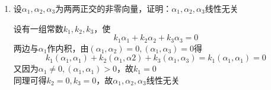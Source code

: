 \documentclass[./linear_algebra.tex]{subfiles}
\begin{document}
\begin{enumerate}
\begin{analysisbox}
        \end{analysisbox}
        \item 设$\alpha_1, \alpha_2, \alpha_3$为两两正交的非零向量，证明：$\alpha_1, \alpha_2, \alpha_3$线性无关
        \begin{analysisbox}
            设有一组常数$k_1, k_{2}, k_3$，使
            \[
                k_1\alpha_1 + k_2\alpha_2 + k_3\alpha_3 = 0
            \]
            两边与$\alpha_1$作内积，由$(\alpha_1, \alpha_2) = 0, (\alpha_1, \alpha_3) = 0$得
            \[
                k_1(\alpha_1, \alpha_1) + k_2(\alpha_1, \alpha2) + k_3(\alpha_1, \alpha_3) = k_1(\alpha_1, \alpha_1) = 0
            \]
            又因为$\alpha_1 \neq 0, (\alpha_1, \alpha_1) > 0$，故$k_1 = 0$ \\
            同理可得$k_2 = 0, k_3 = 0$，故$\alpha_1, \alpha_2, \alpha_3$线性无关
        \end{analysisbox}
    \end{enumerate}
\end{document}
